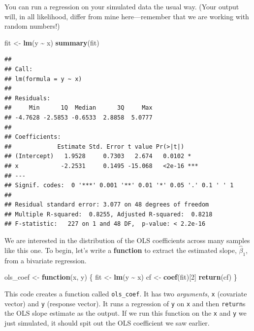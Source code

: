 \documentclass[
  12pt,
  oneside,openany]{book}
\newenvironment{Shaded}{\begin{snugshade}}{\end{snugshade}}
\newcommand{\ControlFlowTok}[1]{\textcolor[rgb]{0.13,0.29,0.53}{\textbf{#1}}}
\newcommand{\DecValTok}[1]{\textcolor[rgb]{0.00,0.00,0.81}{#1}}
\newcommand{\KeywordTok}[1]{\textcolor[rgb]{0.13,0.29,0.53}{\textbf{#1}}}
\newcommand{\NormalTok}[1]{#1}
\newcommand{\OperatorTok}[1]{\textcolor[rgb]{0.81,0.36,0.00}{\textbf{#1}}}
\newcommand{\StringTok}[1]{\textcolor[rgb]{0.31,0.60,0.02}{#1}}
\begin{document}
You can run a regression on your simulated data the usual way.
(Your output will, in all likelihood, differ from mine here---remember that we are working with random numbers!)

\begin{Shaded}
\begin{Highlighting}[]
\NormalTok{fit \textless{}{-}}\StringTok{ }\KeywordTok{lm}\NormalTok{(y }\OperatorTok{\textasciitilde{}}\StringTok{ }\NormalTok{x)}
\KeywordTok{summary}\NormalTok{(fit)}
\end{Highlighting}
\end{Shaded}

\begin{verbatim}
## 
## Call:
## lm(formula = y ~ x)
## 
## Residuals:
##     Min      1Q  Median      3Q     Max 
## -4.7628 -2.5853 -0.6533  2.8858  5.0777 
## 
## Coefficients:
##             Estimate Std. Error t value Pr(>|t|)    
## (Intercept)   1.9528     0.7303   2.674   0.0102 *  
## x            -2.2531     0.1495 -15.068   <2e-16 ***
## ---
## Signif. codes:  0 '***' 0.001 '**' 0.01 '*' 0.05 '.' 0.1 ' ' 1
## 
## Residual standard error: 3.077 on 48 degrees of freedom
## Multiple R-squared:  0.8255, Adjusted R-squared:  0.8218 
## F-statistic:   227 on 1 and 48 DF,  p-value: < 2.2e-16
\end{verbatim}

We are interested in the distribution of the OLS coefficients across many samples like this one.
To begin, let's write a \textbf{function} to extract the estimated slope, \(\hat{\beta}_1\), from a bivariate regression.

\begin{Shaded}
\begin{Highlighting}[]
\NormalTok{ols\_coef \textless{}{-}}\StringTok{ }\ControlFlowTok{function}\NormalTok{(x, y) \{}
\NormalTok{  fit \textless{}{-}}\StringTok{ }\KeywordTok{lm}\NormalTok{(y }\OperatorTok{\textasciitilde{}}\StringTok{ }\NormalTok{x)}
\NormalTok{  cf \textless{}{-}}\StringTok{ }\KeywordTok{coef}\NormalTok{(fit)[}\DecValTok{2}\NormalTok{]}
  \KeywordTok{return}\NormalTok{(cf)}
\NormalTok{\}}
\end{Highlighting}
\end{Shaded}

This code creates a function called \texttt{ols\_coef}.
It has two \emph{arguments}, \texttt{x} (covariate vector) and \texttt{y} (response vector).
It runs a regression of \texttt{y} on \texttt{x} and then \texttt{return}s the OLS slope estimate as the output.
If we run this function on the \texttt{x} and \texttt{y} we just simulated, it should spit out the OLS coefficient we saw earlier.
\end{document}
